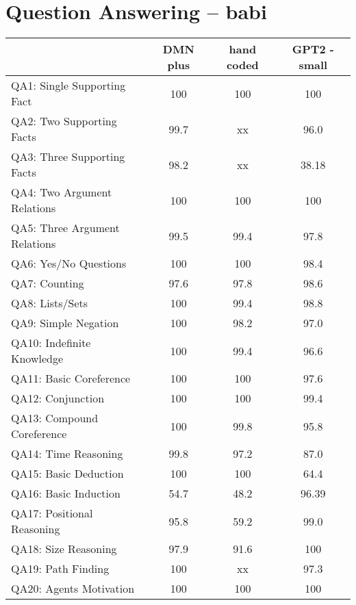 \documentclass[english]{report}
\providecommand{\tabularnewline}{\\}
\begin{document}
\section{Question Answering -- babi}

\begin{center}


\begin{tabular}{|l|c|c|c|}
	\hline 
	& {\small{}DMN plus} & {\small{}hand coded}  & {\small{}GPT2 - small}  \tabularnewline
	\hline 
	\hline 
	{\small{}QA1: Single Supporting Fact} & {\small{}100} & {\small{}100} & {\small{}100}  \tabularnewline
	\hline 
	{\small{}QA2: Two Supporting Facts} & {\small{}99.7} & {\small{}xx}  & {\small{}96.0} \tabularnewline
	\hline 
	{\small{}QA3: Three Supporting Facts} & {\small{}98.2} & {\small{}xx} & {\small{}38.18}  \tabularnewline
	\hline 
	{\small{}QA4: Two Argument Relations} & {\small{}100} & {\small{}100}  & {\small{}100} \tabularnewline
	\hline 
	{\small{}QA5: Three Argument Relations} & {\small{}99.5} & {\small{}99.4}  & {\small{}97.8} \tabularnewline
	\hline 
	{\small{}QA6: Yes/No Questions} & {\small{}100} & {\small{}100}  & {\small{}98.4} \tabularnewline
	\hline 
	{\small{}QA7: Counting} & {\small{}97.6} & {\small{}97.8} & {\small{}98.6} \tabularnewline
	\hline 
	{\small{}QA8: Lists/Sets} & {\small{}100} & {\small{}99.4} & {\small{}98.8} \tabularnewline
	\hline 
	{\small{}QA9: Simple Negation} & {\small{}100} & {\small{}98.2}  & {\small{}97.0}  \tabularnewline
	\hline 
	{\small{}QA10: Indefinite Knowledge} & {\small{}100} & {\small{}99.4} & {\small{}96.6} \tabularnewline
	\hline 
	{\small{}QA11: Basic Coreference} & {\small{}100} & {\small{}100} & {\small{}97.6} \tabularnewline
	\hline 
	{\small{}QA12: Conjunction} & {\small{}100} & {\small{}100} & {\small{}99.4} \tabularnewline
	\hline 
	{\small{}QA13: Compound Coreference} & {\small{}100} & {\small{}99.8} & {\small{}95.8} \tabularnewline
	\hline 
	{\small{}QA14: Time Reasoning} & {\small{}99.8} & {\small{}97.2} & {\small{}87.0} \tabularnewline
	\hline 
	{\small{}QA15: Basic Deduction} & {\small{}100} & {\small{}100} & {\small{}64.4} \tabularnewline
	\hline 
	{\small{}QA16: Basic Induction} & {\small{}54.7} & {\small{}48.2} & {\small{}96.39} \tabularnewline
	\hline 
	{\small{}QA17: Positional Reasoning} & {\small{}95.8} & {\small{}59.2} & {\small{}99.0} \tabularnewline
	\hline 
	{\small{}QA18: Size Reasoning} & {\small{}97.9} & {\small{}91.6} & {\small{}100} \tabularnewline
	\hline 
	{\small{}QA19: Path Finding} & {\small{}100} & {\small{}xx} & {\small{}97.3} \tabularnewline
	\hline 
	{\small{}QA20: Agents Motivation} & {\small{}100} & {\small{}100} & {\small{}100} \tabularnewline
	\hline 
\end{tabular}{\tiny \par}
\label{fig:babiresults}
	
\end{center}

\newpage


%




\end{document}
